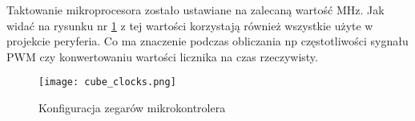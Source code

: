 Taktowanie mikroprocesora zostało ustawiane na zalecaną wartość \unit[80]{MHz}. 
Jak widać na rysunku nr \ref{fig:cube_clocks} z tej wartości korzystają również wszystkie użyte w projekcie peryferia. 
Co ma znaczenie podczas obliczania np częstotliwości sygnału PWM czy konwertowaniu wartości licznika na czas rzeczywisty.

\begin{figure}[ht!]
    \centering
    \texttt{[image: cube\_clocks.png]}
    \caption{Konfiguracja zegarów mikrokontrolera}
    \label{fig:cube_clocks}
\end{figure}



